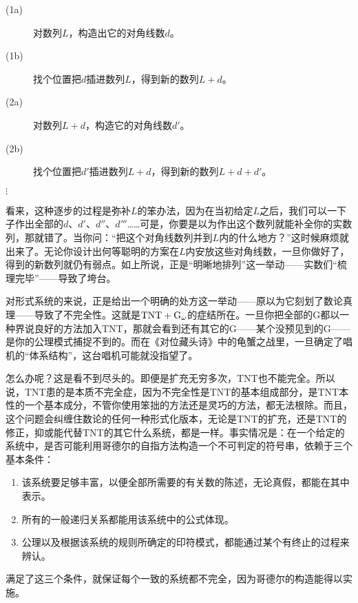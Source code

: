 \begin{description}
\item[(1a)]对数列$L$，构造出它的对角线数$d$。
\item[(1b)]找个位置把$d$插进数列$L$，得到新的数列$L+d$。
\item[(2a)]对数列$L+d$，构造它的对角线数$d'$。
\item[(2b)]找个位置把$d'$插进数列$L+d$，得到新的数列$L+d+d'$。
\item[\quad$\vdots$]
\end{description}
看来，这种逐步的过程是弥补$L$的笨办法，因为在当初给定$L$之后，我们可以一下子作出全部的$d$、$d'$、$d''$、$d'''$……可是，你要是以为作出这个数列就能补全你的实数列，那就错了。当你问：“把这个对角线数列并到$L$内的什么地方？”这时候麻烦就出来了。无论你设计出何等聪明的方案在$L$内安放这些对角线数，一旦你做好了，得到的新数列就仍有弱点。如上所说，正是“明晰地排列”这一举动——实数们“梳理完毕”——导致了垮台。

对形式系统的来说，正是给出一个明确的处方这一举动——原以为它刻划了数论真理——导致了不完全性。这就是$\mathrm { TNT }+\mathrm { G }_\omega$的症结所在。一旦你把全部的G都以一种界说良好的方法加入TNT，那就会看到还有其它的G——某个没预见到的G——是你的公理模式捕捉不到的。而在《对位藏头诗》中的龟蟹之战里，一旦确定了唱机的“体系结构”，这台唱机可能就没指望了。

怎么办呢？这是看不到尽头的。即便是扩充无穷多次，TNT也不能完全。所以说，TNT患的是本质不完全症，因为不完全性是TNT的基本组成部分，是TNT本性的一个基本成分，不管你使用笨拙的方法还是灵巧的方法，都无法根除。而且，这个问题会纠缠住数论的任何一种形式化版本，无论是TNT的扩充，还是TNT的修正，抑或能代替TNT的其它什么系统，都是一样。事实情况是：在一个给定的系统中，是否可能利用哥德尔的自指方法构造一个不可判定的符号串，依赖于三个基本条件：
\begin{enumerate}
\item 该系统要足够丰富，以便全部所需要的有关数的陈述，无论真假，都能在其中表示。
\item 所有的一般递归关系都能用该系统中的公式体现。
\item 公理以及根据该系统的规则所确定的印符模式，都能通过某个有终止的过程来辨认。
\end{enumerate}
满足了这三个条件，就保证每个一致的系统都不完全，因为哥德尔的构造能得以实施。

